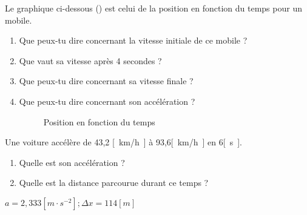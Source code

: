 \begin{exercise}
  Le graphique ci-dessous () est celui de la position en fonction du temps pour un mobile.
  \begin{enumerate}[label=\alph*)]
    \item Que peux-tu dire concernant la vitesse initiale de ce mobile ?
    \item Que vaut sa vitesse après 4 secondes ?
    \item Que peux-tu dire concernant sa vitesse finale ?
    \item Que peux-tu dire concernant son accélération ?
          \begin{figure}[h!]
            \centering
            \caption{Position en fonction du temps}
            \label{fig:position_temps_exe}
          \end{figure}
  \end{enumerate}
\end{exercise}
\begin{solution}
\end{solution}

\begin{exercise}
\end{exercise}

\begin{exercise}
  Une voiture accélère de 43,2 \unit{[km/h]} à 93,6\unit{[km/h]} en 6\unit{[s]}.
  \begin{enumerate}[label=\alph*)]
    \item Quelle est son accélération ?
    \item Quelle est la distance parcourue durant ce temps ?
  \end{enumerate}
\end{exercise}
\begin{solution}
  \(a=2,333\unit{[m \cdot s^{-2}]} ; \Delta x=114[m] \)
\end{solution}


